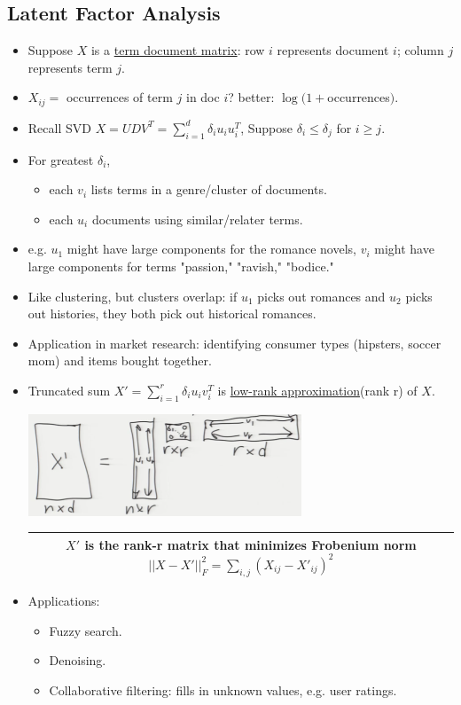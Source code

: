 \documentclass[10pt]{article}
\begin{document}
\subsection*{Latent Factor Analysis}
\begin{itemize}
	\item Suppose $X$ is a \underline{term document matrix}: row $i$ represents document $i$; column $j$ represents term $j$.
	\item $X_{ij} = $ occurrences of term $j$ in doc $i$? better: $\log (1 + $occurrences$)$.
	\item Recall SVD $X = UDV^{T} = \sum_{i=1}^{d} \delta_{i}u_{i}u_{i}^{T}$, Suppose $\delta_{i} \leq \delta_{j}$ for $i \geq j$.
	\item For greatest $\delta_{i}$,
		\begin{itemize}
			\item each $v_{i}$ lists terms in a genre/cluster of documents.
			\item each $u_{i}$ documents using similar/relater terms.
		\end{itemize}
	\item e.g. $u_{1}$ might have large components for the romance novels, $v_{i}$ might have large components for terms "passion," "ravish," "bodice."
	\item Like clustering, but clusters overlap: if $u_{1}$ picks out romances and $u_{2}$ picks out histories, they both pick out historical romances.
	\item Application in market research: identifying consumer types (hipsters, soccer mom) and items bought together.
	\item Truncated sum $X' = \sum_{i=1}^{r} \delta_{i}u_{i}v_{i}^{T}$ is \underline{low-rank approximation}(rank r) of $X$.
		\begin{center}
			\includegraphics{../images/reducedx}
		\end{center}
		\begin{center}
			\begin{tabular}{|c|}
				\hline
				$X'$ is the rank-r matrix that minimizes Frobenium norm $||X-X'||_{F}^{2} = \sum_{i,j} (X_{ij}-X'_{ij})^{2}$\\
				\hline
			\end{tabular}
		\end{center}
	\item Applications:
		\begin{itemize}
			\item Fuzzy search.
			\item Denoising.
			\item Collaborative filtering: fills in unknown values, e.g. user ratings.
		\end{itemize}
\end{itemize}
\end{document}
